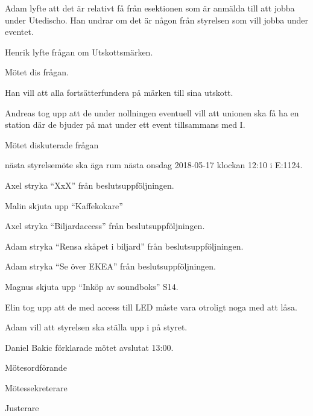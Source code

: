 \documentclass[10pt]{article}
\def\mo{Daniel Bakic}
\def\ms{Axel Voss}
\def\ji{Adam Belfrage}
\begin{document}
\begin{paragrafer}
        Adam lyfte att det är relativt få från esektionen som är anmälda till att jobba under Utedischo. Han undrar om det är någon från styrelsen som vill jobba under eventet.
    
      
        Henrik lyfte frågan om Utskottsmärken.
    
        Mötet dis frågan.
    
        Han vill att alla fortsätterfundera på märken till sina utskott. 
    
        
        Andreas tog upp att de under nollningen eventuell vill att unionen ska få ha en station där de bjuder på mat under ett event tillsammans med I.
        
        Mötet diskuterade frågan 
    
        \Mba nästa styrelsemöte ska äga rum nästa onsdag 2018-05-17 klockan 12:10 i E:1124.
          
        
        
        Axel \ypa stryka ``XxX'' från beslutsuppföljningen. 
    
        \Mbaby 
    
        Malin \ypa skjuta upp ``Kaffekokare''
    
        \Mbaby 
        
        Axel \ypa stryka ``Biljardaccess'' från beslutsuppföljningen.
    
        \Mbaby 
        
        Adam \ypa stryka ``Rensa skåpet i biljard'' från beslutsuppföljningen.
    
        \Mbaby 
        
        Adam \ypa stryka ``Se över EKEA'' från beslutsuppföljningen.
        
        \Mbaby 
        
        Magnus \ypa skjuta upp ``Inköp av soundboks'' S14.
        
        \Mbaby 	
        
        Elin tog upp att de med access till LED måste vara otroligt noga med att låsa.
        
        Adam vill att styrelsen ska ställa upp i på styret. 
    
    
        {\mo} förklarade mötet avslutat 13:00.
    \end{paragrafer}
    
    \hidesignfoot
    \begin{signatures}{3}
        \signature{\mo}{Mötesordförande}
        \signature{\ms}{Mötessekreterare}
        \signature{\ji}{Justerare}
    \end{signatures}
    
\end{document}
